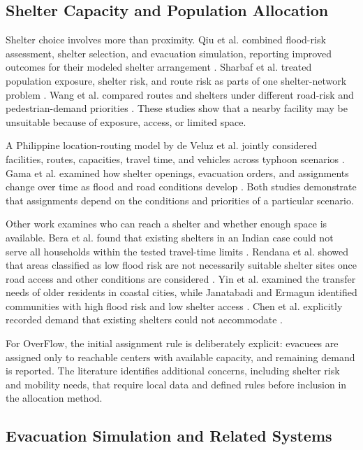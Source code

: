 \subsection{Shelter Capacity and Population Allocation}

Shelter choice involves more than proximity. Qiu et al. combined flood-risk assessment, shelter selection, and evacuation simulation, reporting improved outcomes for their modeled shelter arrangement \cite{qiu2024}. Sharbaf et al. treated population exposure, shelter risk, and route risk as parts of one shelter-network problem \cite{sharbaf2025}. Wang et al. compared routes and shelters under different road-risk and pedestrian-demand priorities \cite{wang2024}. These studies show that a nearby facility may be unsuitable because of exposure, access, or limited space.

A Philippine location-routing model by de Veluz et al. jointly considered facilities, routes, capacities, travel time, and vehicles across typhoon scenarios \cite{develuz2023}. Gama et al. examined how shelter openings, evacuation orders, and assignments change over time as flood and road conditions develop \cite{gama2016}. Both studies demonstrate that assignments depend on the conditions and priorities of a particular scenario.

Other work examines who can reach a shelter and whether enough space is available. Bera et al. found that existing shelters in an Indian case could not serve all households within the tested travel-time limits \cite{bera2023}. Rendana et al. showed that areas classified as low flood risk are not necessarily suitable shelter sites once road access and other conditions are considered \cite{rendana2025}. Yin et al. examined the transfer needs of older residents in coastal cities, while Janatabadi and Ermagun identified communities with high flood risk and low shelter access \cite{yin2024,janatabadi2025}. Chen et al. explicitly recorded demand that existing shelters could not accommodate \cite{chen2021}.

For OverFlow, the initial assignment rule is deliberately explicit: evacuees are assigned only to reachable centers with available capacity, and remaining demand is reported. The literature identifies additional concerns, including shelter risk and mobility needs, that require local data and defined rules before inclusion in the allocation method.

\subsection{Evacuation Simulation and Related Systems}


